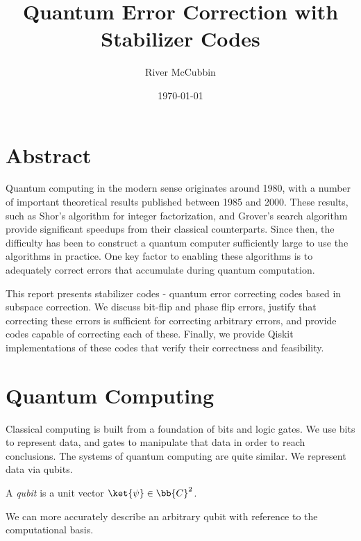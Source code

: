 \documentclass{article}
\title{Quantum Error Correction with Stabilizer Codes}
\author{River McCubbin}
\date{\today}
\begin{document}
\maketitle

\section{Abstract}

Quantum computing in the modern sense originates around 1980, with a number of important theoretical results published between 1985 and 2000.
These results, such as Shor's algorithm for integer factorization, and Grover's search algorithm provide significant speedups from their classical counterparts.
Since then, the difficulty has been to construct a quantum computer sufficiently large to use the algorithms in practice.
One key factor to enabling these algorithms is to adequately correct errors that accumulate during quantum computation.

This report presents stabilizer codes - quantum error correcting codes based in subspace correction.
We discuss bit-flip and phase flip errors, justify that correcting these errors is sufficient for correcting arbitrary errors, and provide codes capable of correcting each of these.
Finally, we provide Qiskit implementations of these codes that verify their correctness and feasibility.

\section{Quantum Computing}

        Classical computing is built from a foundation of bits and logic gates.
        We use bits to represent data, and gates to manipulate that data in order to reach conclusions.
        The systems of quantum computing are quite similar.
        We represent data via qubits.
        \begin{definition}
                A \textit{qubit} is a unit vector $\ket{\psi} \in \bb{C}^2$.
        \end{definition}

        We can more accurately describe an arbitrary qubit with reference to the computational basis.
        
\end{document}

